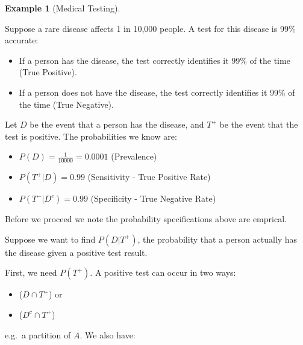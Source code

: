 \documentclass[
  letterpaper,
  DIV=11,
  numbers=noendperiod]{scrreport}
\providecommand{\tightlist}{%
  \setlength{\itemsep}{0pt}\setlength{\parskip}{0pt}}
\theoremstyle{definition}
\newtheorem{example}{Example}[chapter]
\theoremstyle{plain}
\theoremstyle{definition}
\theoremstyle{plain}
\theoremstyle{remark}
\begin{document}
\begin{tcolorbox}[enhanced jigsaw, breakable, opacityback=0, leftrule=.75mm, colback=white, bottomtitle=1mm, coltitle=black, toptitle=1mm, titlerule=0mm, bottomrule=.15mm, colframe=quarto-callout-note-color-frame, title={Example of Law of Total Probability and Bayes' Rule}, opacitybacktitle=0.6, colbacktitle=quarto-callout-note-color!10!white, rightrule=.15mm, arc=.35mm, toprule=.15mm, left=2mm]

\begin{example}[Medical
Testing]\protect\hypertarget{exm-total-probability-bayes}{}\label{exm-total-probability-bayes}

Suppose a rare disease affects 1 in 10,000 people. A test for this
disease is 99\% accurate:

\begin{itemize}
\tightlist
\item
  If a person has the disease, the test correctly identifies it 99\% of
  the time (True Positive).
\item
  If a person does not have the disease, the test correctly identifies
  it 99\% of the time (True Negative).
\end{itemize}

Let \(D\) be the event that a person has the disease, and \(T^+\) be the
event that the test is positive. The probabilities we know are:

\begin{itemize}
\tightlist
\item
  \(P(D) = \frac{1}{10000} = 0.0001\) (Prevalence)
\item
  \(P(T^+|D) = 0.99\) (Sensitivity - True Positive Rate)
\item
  \(P(T^-|D^c) = 0.99\) (Specificity - True Negative Rate)
\end{itemize}

Before we proceed we note the probability specifications above are
emprical.

Suppose we want to find \(P(D|T^+)\), the probability that a person
actually has the disease given a positive test result.

First, we need \(P(T^+)\). A positive test can occur in two ways:

\begin{itemize}
\item
  (\(D \cap T^+\)) or
\item
  (\(D^c \cap T^+\))
\end{itemize}

e.g.~a partition of \(A\). We also have:


\end{example}
\end{tcolorbox}
\end{document}
